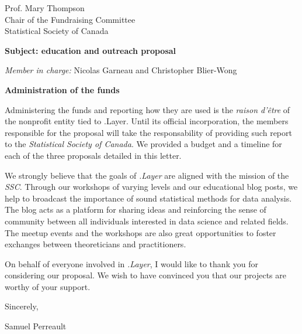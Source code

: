 \documentclass[11pt, a4paper]{letter} %
\begin{document}
\begin{letter}{
	Prof. Mary Thompson\\
	Chair of the Fundraising Committee\\
	Statistical Society of Canada
	
	\bigskip
	\textbf{Subject: education and outreach proposal}%
}
\begin{enumerate}
			
	\bigskip
	\emph{Member in charge:} Nicolas Garneau and Christopher Blier-Wong\\
	
\end{enumerate}


\bigskip
\noindent \textbf{Administration of the funds}

Administering the funds and reporting how they are used is the \emph{raison d'\^{e}tre} of the nonprofit entity tied to .Layer. Until its official incorporation, the members responsible for the proposal will take the responsability of providing such report to the \emph{Statistical Society of Canada}. We provided a budget and a timeline for each of the three proposals detailed in this letter.

\bigskip

We strongly believe that the goals of \emph{.Layer} are aligned with the mission of the \emph{SSC}. Through our workshops of varying levels and our educational blog posts, we help to broadcast the importance of sound statistical methods for data analysis. The blog acts as a platform for sharing ideas and reinforcing the sense of community between all individuals interested in data science and related fields. The meetup events and the workshops are also great opportunities to foster exchanges between theoreticians and practitioners.

On behalf of everyone involved in \emph{.Layer}, I would like to thank you for considering our proposal. We wish to have convinced you that our projects are worthy of your support.

\closing{Sincerely,}

\noindent Samuel Perreault




\end{letter}
\end{document}
